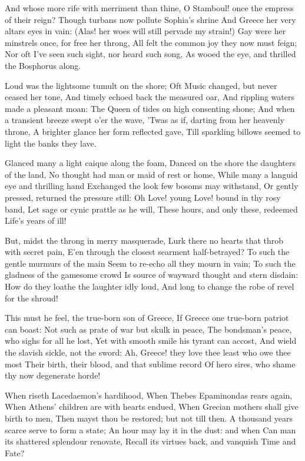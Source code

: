 \documentclass[10pt,twocolumn]{book}
\begin{document}
   And whose more rife with merriment than thine,
   O Stamboul! once the empress of their reign?
   Though turbans now pollute Sophia's shrine
   And Greece her very altars eyes in vain:
   (Alas! her woes will still pervade my strain!)
   Gay were her minstrels once, for free her throng,
   All felt the common joy they now must feign;
   Nor oft I've seen such sight, nor heard such song,
As wooed the eye, and thrilled the Bosphorus along.


   Loud was the lightsome tumult on the shore;
   Oft Music changed, but never ceased her tone,
   And timely echoed back the measured oar,
   And rippling waters made a pleasant moan:
   The Queen of tides on high consenting shone;
   And when a transient breeze swept o'er the wave,
   'Twas as if, darting from her heavenly throne,
   A brighter glance her form reflected gave,
Till sparkling billows seemed to light the banks they lave.


   Glanced many a light caique along the foam,
   Danced on the shore the daughters of the land,
   No thought had man or maid of rest or home,
   While many a languid eye and thrilling hand
   Exchanged the look few bosoms may withstand,
   Or gently pressed, returned the pressure still:
   Oh Love! young Love! bound in thy rosy band,
   Let sage or cynic prattle as he will,
These hours, and only these, redeemed Life's years of ill!


   But, midst the throng in merry masquerade,
   Lurk there no hearts that throb with secret pain,
   E'en through the closest searment half-betrayed?
   To such the gentle murmurs of the main
   Seem to re-echo all they mourn in vain;
   To such the gladness of the gamesome crowd
   Is source of wayward thought and stern disdain:
   How do they loathe the laughter idly loud,
And long to change the robe of revel for the shroud!


   This must he feel, the true-born son of Greece,
   If Greece one true-born patriot can boast:
   Not such as prate of war but skulk in peace,
   The bondsman's peace, who sighs for all he lost,
   Yet with smooth smile his tyrant can accost,
   And wield the slavish sickle, not the sword:
   Ah, Greece! they love thee least who owe thee most\textemdash
   Their birth, their blood, and that sublime record
Of hero sires, who shame thy now degenerate horde!


   When riseth Lacedaemon's hardihood,
   When Thebes Epaminondas rears again,
   When Athens' children are with hearts endued,
   When Grecian mothers shall give birth to men,
   Then mayst thou be restored; but not till then.
   A thousand years scarce serve to form a state;
   An hour may lay it in the dust:  and when
   Can man its shattered splendour renovate,
Recall its virtues back, and vanquish Time and Fate?
\end{document}
